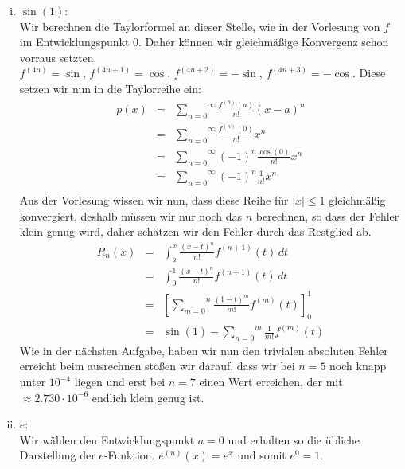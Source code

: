 \documentclass[11pt,a4paper,ngerman]{article}
\begin{document}
\begin{enumerate}[(i)]
    \item $\sin (1)$:\\
        Wir berechnen die Taylorformel an dieser Stelle, wie in der Vorlesung von $f$ im Entwicklungspunkt
        $0$. Daher können wir gleichmäßige Konvergenz schon vorraus setzten.\\
        $f^{(4n)} = \sin$, $f^{(4n+1)} = \cos$, $f^{(4n+2)} = -\sin$, $f^{(4n+3)} = -\cos$. Diese
        setzen wir nun in die Taylorreihe ein:
        $$\begin{array}{rcl}
            p(x) &=& \overset{\infty}{\underset{n=0}{\sum}} \frac{f^{(n)}(a)}{n!}(x-a)^n\\
                &=&  \overset{\infty}{\underset{n=0}{\sum}} \frac{f^{(n)}(0)}{n!}x^n\\
                &=& \overset{\infty}{\underset{n=0}{\sum}} (-1)^{n}\frac{\cos(0)}{n!}x^n\\
                &=& \overset{\infty}{\underset{n=0}{\sum}} (-1)^{n}\frac{1}{n!}x^n\\
        \end{array}$$
        Aus der Vorlesung wissen wir nun, dass diese Reihe für $|x|\leq1$ gleichmäßig konvergiert,
        deshalb müssen wir nur noch das $n$ berechnen, so dass der Fehler klein genug wird,
        daher schätzen wir den Fehler durch das Restglied ab.\\
        $$\begin{array}{rcl}
            R_n(x) &=& \int_a^x \frac{(x-t)^n}{n!}f^{(n+1)}(t) \, dt\\
                &=&  \int_0^1 \frac{(x-t)^n}{n!}f^{(n+1)}(t) \, dt\\
                &=& \left[ \overset{n}{\underset{m=0}{\sum}} \frac{(1-t)^m}{m!}f^{(m)}(t)\right]_0^1\\
                &=& \sin(1) - \overset{m}{\underset{n=0}{\sum}} \frac{1}{m!} f^{(m)}(t)
        \end{array}$$
        Wie in der nächsten Aufgabe, haben wir nun den trivialen absoluten Fehler erreicht beim
        ausrechnen stoßen wir darauf, dass wir bei $n=5$ noch knapp unter $10^{-4}$ liegen und
        erst bei $n=7$ einen Wert erreichen, der mit $\approx 2.730 \cdot 10^{-6}$ endlich klein genug ist.
    \item $e$:\\
        Wir wählen den Entwicklungspunkt $a=0$ und erhalten so die übliche Darstellung der $e$-Funktion.
        $e^{(n)}(x) = e^x$ und somit $e^0 = 1$.\\

\end{enumerate}
\end{document}
